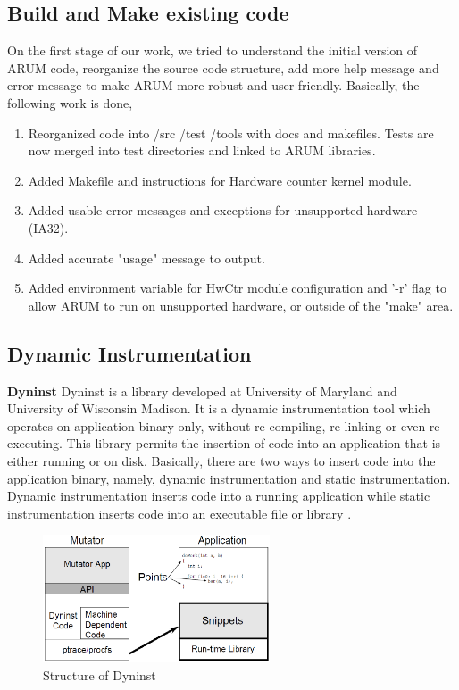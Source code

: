 \documentclass[11pt,letterpaper,oneside]{article}
\begin{document}
\subsection{Build and Make existing code}
On the first stage of our work, we tried to understand the initial version of ARUM code, reorganize the source code structure, add more help message and error message to make ARUM more robust and user-friendly. Basically, the following work is done,
\begin{enumerate}
\item Reorganized code into /src /test /tools with docs and makefiles.  Tests are now merged into test directories and linked to ARUM libraries.
\item Added Makefile and instructions for Hardware counter kernel module.
\item Added usable error messages and exceptions for unsupported hardware (IA32).
\item Added accurate "usage" message to output.
\item Added environment variable for HwCtr module configuration and '-r' flag to allow ARUM to run on unsupported hardware, or outside of the "make" area.
\end{enumerate}

\subsection{Dynamic Instrumentation}
\textbf{Dyninst}\newline
\indent Dyninst is a library developed at University of Maryland and University of Wisconsin Madison. It is a dynamic instrumentation tool which operates on application binary only, without re-compiling, re-linking or even re-executing. This library permits the insertion of code into an application that is either running or on disk. Basically, there are two ways to insert code into the application binary, namely, dynamic instrumentation and static instrumentation. Dynamic instrumentation inserts code into a running application while static instrumentation inserts code into an executable file or library \cite{bib:dyninstmanual}.

\begin{figure}
\begin{center}
\includegraphics[width=0.6\textwidth]{dyninst.eps}
\caption{Structure of Dyninst}
\label{fig:dyninst}
\end{center}
\end{figure}
\end{document}
